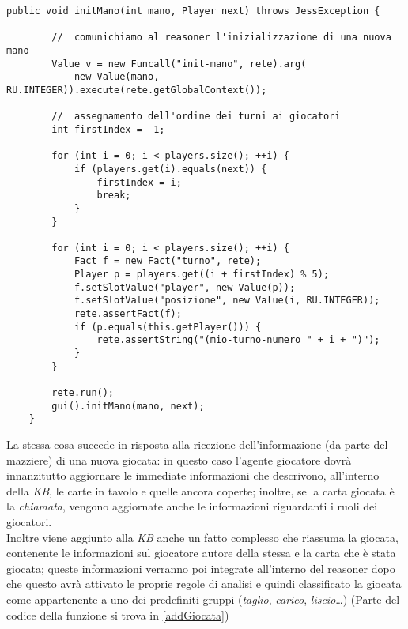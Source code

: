 \begin{lstlisting}[caption={il metodo \texttt{initMano} di PlayerAgent},label=initMano]
    public void initMano(int mano, Player next) throws JessException {

        //  comunichiamo al reasoner l'inizializzazione di una nuova mano
        Value v = new Funcall("init-mano", rete).arg(
            new Value(mano, RU.INTEGER)).execute(rete.getGlobalContext());

        //  assegnamento dell'ordine dei turni ai giocatori
        int firstIndex = -1;

        for (int i = 0; i < players.size(); ++i) {
            if (players.get(i).equals(next)) {
                firstIndex = i;
                break;
            }
        }

        for (int i = 0; i < players.size(); ++i) {
            Fact f = new Fact("turno", rete);
            Player p = players.get((i + firstIndex) % 5);
            f.setSlotValue("player", new Value(p));
            f.setSlotValue("posizione", new Value(i, RU.INTEGER));
            rete.assertFact(f);
            if (p.equals(this.getPlayer())) {
                rete.assertString("(mio-turno-numero " + i + ")");
            }
        }

        rete.run();
        gui().initMano(mano, next);
    }
\end{lstlisting}



La stessa cosa succede in risposta alla ricezione dell'informazione (da parte del mazziere) di una nuova giocata: in questo caso l'agente giocatore dovrà innanzitutto aggiornare le immediate informazioni che descrivono, all'interno della \emph{KB}, le carte in tavolo e quelle ancora coperte; inoltre, se la carta giocata è la \emph{chiamata}, vengono aggiornate anche le informazioni riguardanti i ruoli dei giocatori.\\
Inoltre viene aggiunto alla \emph{KB} anche un fatto complesso che riassuma la giocata, contenente le informazioni sul giocatore autore della stessa e la carta che è stata giocata; queste informazioni verranno poi integrate all'interno del reasoner dopo che questo avrà attivato le proprie regole di analisi e quindi classificato la giocata come appartenente a uno dei predefiniti gruppi (\emph{taglio}, \emph{carico}, \emph{liscio}\dots) (Parte del codice della funzione si trova in \ref{addGiocata})

